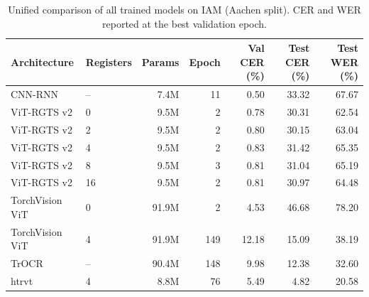 \begin{table}[t]
\centering
\caption{Unified comparison of all trained models on IAM (Aachen split). CER and WER reported at the best validation epoch.}
\label{tab:results}
\begin{tabular}{llrrrrr}
\toprule
Architecture & Registers & Params & Epoch & Val CER (\%) & Test CER (\%) & Test WER (\%) \\
\midrule
CNN-RNN & -- & 7.4M & 11 & 0.50 & 33.32 & 67.67 \\
\midrule
ViT-RGTS v2 & 0 & 9.5M & 2 & 0.78 & 30.31 & 62.54 \\
ViT-RGTS v2 & 2 & 9.5M & 2 & 0.80 & 30.15 & 63.04 \\
ViT-RGTS v2 & 4 & 9.5M & 2 & 0.83 & 31.42 & 65.35 \\
ViT-RGTS v2 & 8 & 9.5M & 3 & 0.81 & 31.04 & 65.19 \\
ViT-RGTS v2 & 16 & 9.5M & 2 & 0.81 & 30.97 & 64.48 \\
\midrule
TorchVision ViT & 0 & 91.9M & 2 & 4.53 & 46.68 & 78.20 \\
TorchVision ViT & 4 & 91.9M & 149 & 12.18 & 15.09 & 38.19 \\
\midrule
TrOCR & -- & 90.4M & 148 & 9.98 & 12.38 & 32.60 \\
\midrule
htrvt & 4 & 8.8M & 76 & 5.49 & 4.82 & 20.58 \\
\bottomrule
\end{tabular}
\end{table}
